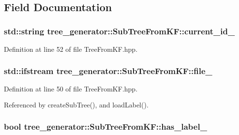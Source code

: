 \subsection{Field Documentation}
\hypertarget{classtree__generator_1_1SubTreeFromKF_a93cab044cd81910fd6b22522e7aa12a6_a93cab044cd81910fd6b22522e7aa12a6}{
\subsubsection[{current\-\_\-id\-\_\-}]{\setlength{\rightskip}{0pt plus 5cm}std\-::string tree\-\_\-generator\-::\-Sub\-Tree\-From\-K\-F\-::current\-\_\-id\-\_\-\hspace{0.3cm}{\ttfamily [private]}}}\label{classtree__generator_1_1SubTreeFromKF_a93cab044cd81910fd6b22522e7aa12a6_a93cab044cd81910fd6b22522e7aa12a6}


Definition at line 52 of file Tree\-From\-K\-F.\-hpp.

\hypertarget{classtree__generator_1_1SubTreeFromKF_a66c16669fa438a7a923a88557f8c9654_a66c16669fa438a7a923a88557f8c9654}{
\subsubsection[{file\-\_\-}]{\setlength{\rightskip}{0pt plus 5cm}std\-::ifstream tree\-\_\-generator\-::\-Sub\-Tree\-From\-K\-F\-::file\-\_\-\hspace{0.3cm}{\ttfamily [private]}}}\label{classtree__generator_1_1SubTreeFromKF_a66c16669fa438a7a923a88557f8c9654_a66c16669fa438a7a923a88557f8c9654}


Definition at line 50 of file Tree\-From\-K\-F.\-hpp.



Referenced by create\-Sub\-Tree(), and load\-Label().

\hypertarget{classtree__generator_1_1SubTreeFromKF_abf3280300d7972d36344adf0196d6aba_abf3280300d7972d36344adf0196d6aba}{
\subsubsection[{has\-\_\-label\-\_\-}]{\setlength{\rightskip}{0pt plus 5cm}bool tree\-\_\-generator\-::\-Sub\-Tree\-From\-K\-F\-::has\-\_\-label\-\_\-\hspace{0.3cm}{\ttfamily [private]}}}\label{classtree__generator_1_1SubTreeFromKF_abf3280300d7972d36344adf0196d6aba_abf3280300d7972d36344adf0196d6aba}


